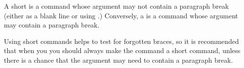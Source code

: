 A \gls*{short} is a \gls{command} whose \gls{argument} may not
contain a paragraph break (either as a blank line or using
.) Conversely, a  is a command whose
\gls{argument} may contain a paragraph break.

Using short commands helps to test for forgotten braces, so it is
recommended that when you  you should
always make the command a short command, unless there is a chance
that the argument may need to contain a paragraph break.
